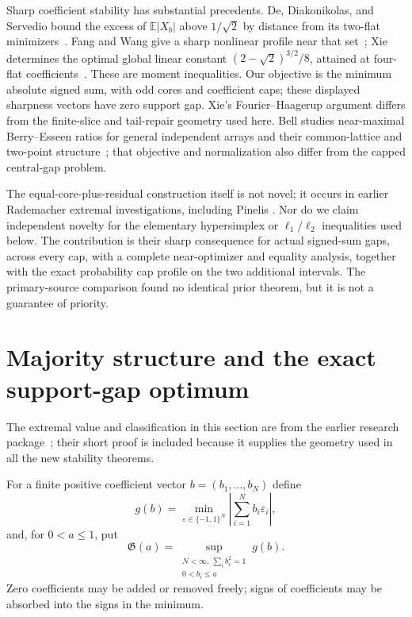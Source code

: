 \documentclass[11pt]{article}
\theoremstyle{remark}\newtheorem{remark}[theorem]{Remark}
\newcommand{\E}{\mathbb E}
\begin{document}
Sharp coefficient stability has substantial precedents. De, Diakonikolas,
and Servedio bound the excess of $\E|X_b|$ above $1/\sqrt2$ by distance
from its two-flat minimizers~\cite{DDS}. Fang and Wang give a sharp
nonlinear profile near that set~\cite{FW}; Xie determines the optimal
global linear constant $(2-\sqrt2)^{3/2}/8$, attained at four-flat
coefficients~\cite{Xie}. These are moment inequalities. Our objective is
the minimum absolute signed sum, with odd cores and coefficient caps;
these displayed sharpness vectors have zero support gap.
Xie's Fourier--Haagerup argument differs from the finite-slice and
tail-repair geometry used here. Bell studies near-maximal Berry--Esseen
ratios for general independent arrays and their common-lattice and
two-point structure~\cite{Bell}; that objective and normalization also
differ from the capped central-gap problem.

The equal-core-plus-residual construction itself is not novel; it occurs
in earlier Rademacher extremal investigations, including Pinelis
\cite{Pinelis}. Nor do we claim independent novelty for the elementary
hypersimplex or $\ell_1/\ell_2$ inequalities used below. The contribution
is their sharp consequence for actual signed-sum gaps, across every cap,
with a complete near-optimizer and equality analysis, together with the
exact probability cap profile on the two additional intervals.
The primary-source comparison found no identical prior theorem, but it
is not a guarantee of priority.

\section{Majority structure and the exact support-gap optimum}\label{gap:section}

The extremal value and classification in this section are from the earlier
research package~\cite{Prior}; their short proof is included because it
supplies the geometry used in all the new stability theorems.


For a finite positive coefficient vector $b=(b_1,\ldots,b_N)$ define
\[
 g(b)=
 \min_{\varepsilon\in\{-1,1\}^N}
 \left|\sum_{i=1}^N b_i\varepsilon_i\right|,
\]
and, for $0<a\le1$, put
\[
 \mathfrak G(a)=
 \sup_{\substack{N<\infty,\ \sum_i b_i^2=1\\0<b_i\le a}}
 g(b).
\]
Zero coefficients may be added or removed freely; signs of coefficients
may be absorbed into the signs in the minimum.
\end{document}
